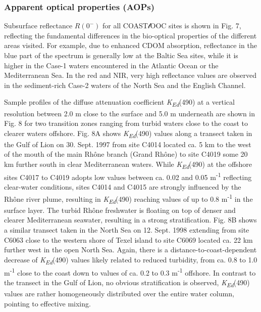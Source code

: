\documentclass[essd, manuscript]{copernicus}
\begin{document}
\subsubsection{Apparent optical properties (AOPs)}

Subsurface reflectance $R(0^-)$ for all COAST$\mathscr{l}$OOC sites is shown in Fig. 7, reflecting the fundamental differences in the bio-optical properties of the different areas visited. For example, due to enhanced CDOM absorption, reflectance in the blue part of the spectrum is generally low at the Baltic Sea sites, while it is higher in the Case-1 waters encountered in the Atlantic Ocean or the Mediterranean Sea. In the red and NIR, very high reflectance values are observed in the sediment-rich Case-2 waters of the North Sea and the English Channel.

Sample profiles of the diffuse attenuation coefficient \textit{K\textsubscript{Ed}}(490) at a vertical resolution between 2.0 m close to the surface and 5.0 m underneath are shown in Fig. 8 for two transition zones ranging from turbid waters close to the coast to clearer waters offshore. Fig. 8A shows \textit{K\textsubscript{Ed}}(490) values along a transect taken in the Gulf of Lion on 30. Sept. 1997 from site C4014 located ca. 5 km to the west of the mouth of the main Rhône branch (Grand Rhône) to site C4019 some 20 km further south in clear Mediterranean waters. While \textit{K\textsubscript{Ed}}(490) at the offshore sites C4017 to C4019 adopts low values between ca. 0.02 and 0.05 m\textsuperscript{-1} reflecting clear-water conditions, sites C4014 and C4015 are strongly influenced by the Rhône river plume, resulting in \textit{K\textsubscript{Ed}}(490) reaching values of up to 0.8 m\textsuperscript{-1} in the surface layer. The turbid Rhône freshwater is floating on top of denser and clearer Mediterranean seawater, resulting in a strong stratification. Fig. 8B shows a similar transect taken in the North Sea on 12. Sept. 1998 extending from site C6063 close to the western shore of Texel island to site C6069 located ca. 22 km further west in the open North Sea. Again, there is a distance-to-coast-dependent decrease of \textit{K\textsubscript{Ed}}(490) values likely related to reduced turbidity, from ca. 0.8 to 1.0 m\textsuperscript{-1} close to the coast down to values of ca. 0.2 to 0.3 m\textsuperscript{-1} offshore. In contrast to the transect in the Gulf of Lion, no obvious stratification is observed, \textit{K\textsubscript{Ed}}(490) values are rather homogeneously distributed over the entire water column, pointing to effective mixing.
\end{document}
